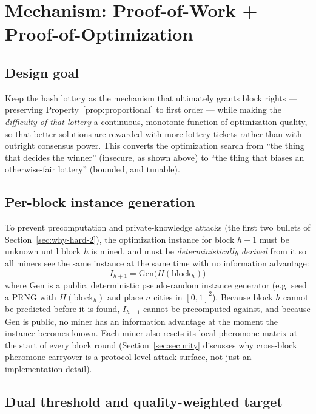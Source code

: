\documentclass[journal]{IEEEtran}
\begin{document}
\section{Mechanism: Proof-of-Work + Proof-of-Optimization}
\label{sec:mechanism}

\subsection{Design goal}

Keep the hash lottery as the mechanism that ultimately grants block rights ---
preserving Property~\ref{prop:proportional} to first order --- while making the
\emph{difficulty of that lottery} a continuous, monotonic function of
optimization quality, so that better solutions are rewarded with more lottery
tickets rather than with outright consensus power. This converts the
optimization search from ``the thing that decides the winner'' (insecure, as
shown above) to ``the thing that biases an otherwise-fair lottery''
(bounded, and tunable).

\subsection{Per-block instance generation}

To prevent precomputation and private-knowledge attacks (the first two
bullets of Section~\ref{sec:why-hard-2}), the optimization instance for block
$h+1$ must be unknown until block $h$ is mined, and must be
\emph{deterministically derived} from it so all miners see the same instance
at the same time with no information advantage:
\[
I_{h+1} = \mathrm{Gen}\big(H(\text{block}_h)\big)
\]
where $\mathrm{Gen}$ is a public, deterministic pseudo-random instance
generator (e.g. seed a PRNG with $H(\text{block}_h)$ and place $n$ cities in
$[0,1]^2$). Because block $h$ cannot be predicted before it is found, $I_{h+1}$
cannot be precomputed against, and because $\mathrm{Gen}$ is public, no miner
has an information advantage at the moment the instance becomes known. Each
miner also resets its local pheromone matrix at the start of every block round
(Section~\ref{sec:security} discusses why cross-block pheromone carryover is a
protocol-level attack surface, not just an implementation detail).

\subsection{Dual threshold and quality-weighted target}
\end{document}
